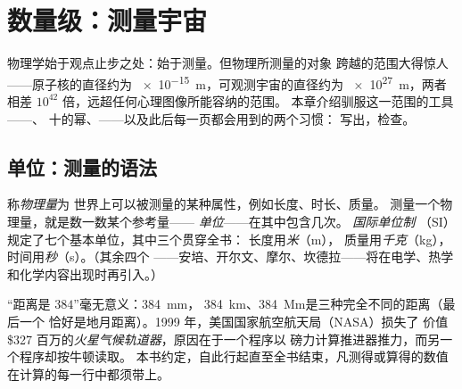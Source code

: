 \chapter{数量级：测量宇宙}\label{ch:g10:orders-of-magnitude}

物理学始于观点止步之处：始于测量。但物理所测量的对象
跨越的范围大得惊人——原子核的直径约为
\qty{e-15}{m}，可观测宇宙的直径约为 \qty{e27}{m}，两者相差
$10^{42}$ 倍，远超任何心理图像所能容纳的范围。
本章介绍驯服这一范围的工具——、
十的幂、——以及此后每一页都会用到的两个习惯：
写出，检查。

\section{单位：测量的语法}

\begin{definition}[物理量与国际单位制]\label{def:g10:orders-of-magnitude:unit}
称\emph{物理量}为
世界上可以被测量的某种属性，例如长度、时长、质量。
测量一个物理量，就是数一数某个参考量——
\emph{单位}——在其中包含几次。
\emph{国际单位制}
（SI）规定了七个基本单位，其中三个贯穿全书：
长度用\emph{米}（\unit{m}），
质量用\emph{千克}（\unit{kg}），
时间用\emph{秒}（\unit{s}）。（其余四个
——安培、开尔文、摩尔、坎德拉——将在电学、热学
和化学内容出现时再引入。）
\end{definition}

\begin{remark}[没有单位的数不是结果]\label{rem:g10:orders-of-magnitude:units}
“距离是 $384$”毫无意义：\qty{384}{mm}，
\qty{384}{km}、\qty{384}{Mm}是三种完全不同的距离（最后一个
恰好是地月距离）。1999 年，美国国家航空航天局（NASA）损失了
价值 \$327 百万的\emph{火星气候轨道器}，原因在于一个程序以
磅力计算推进器推力，而另一个程序却按牛顿读取。
本书约定，自此行起直至全书结束，凡测得或算得的数值
在计算的每一行中都须带上。
\end{remark}

